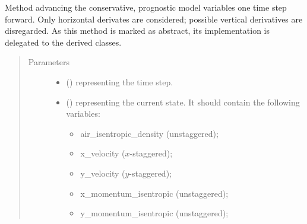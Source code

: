 \documentclass[letterpaper,10pt,english]{sphinxmanual}
\begin{document}
\begin{fulllineitems}
\begin{fulllineitems}
\begin{quote}
\begin{description}
\begin{itemize}
\begin{itemize}
\end{itemize}

\end{itemize}


\end{description}\end{quote}

\end{fulllineitems}


\begin{fulllineitems}
\label{\detokenize{api:tasmania.dycore.prognostic_isentropic.PrognosticIsentropic.step_neglecting_vertical_advection}}
Method advancing the conservative, prognostic model variables one time step forward.
Only horizontal derivates are considered; possible vertical derivatives are disregarded.
As this method is marked as abstract, its implementation is delegated to the derived classes.
\begin{quote}\begin{description}
\item[{Parameters}] \leavevmode\begin{itemize}
\item {} 
 () \textendash{}  representing the time step.

\item {} 
 () \textendash{} 
{\hyperref[\detokenize{api:tasmania.storages.state_isentropic.StateIsentropic}]{}} representing the current state.
It should contain the following variables:
\begin{itemize}
\item {} 
air\_isentropic\_density (unstaggered);

\item {} 
x\_velocity (\(x\)-staggered);

\item {} 
y\_velocity (\(y\)-staggered);

\item {} 
x\_momentum\_isentropic (unstaggered);

\item {} 
y\_momentum\_isentropic (unstaggered);


\end{itemize}
\end{itemize}
\end{description}
\end{quote}
\end{fulllineitems}
\end{fulllineitems}
\end{document}
